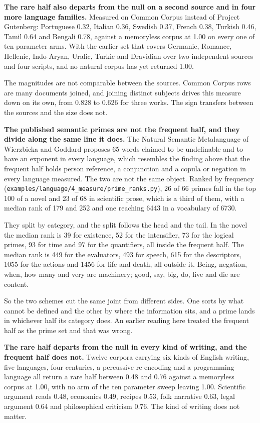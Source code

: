 \textbf{The rare half also departs from the null on a second source and in four more language families.} Measured on Common Corpus instead of Project Gutenberg: Portuguese 0.32, Italian 0.36, Swedish 0.37, French 0.38, Turkish 0.46, Tamil 0.64 and Bengali 0.78, against a memoryless corpus at 1.00 on every one of ten parameter arms. With the earlier set that covers Germanic, Romance, Hellenic, Indo-Aryan, Uralic, Turkic and Dravidian over two independent sources and four scripts, and no natural corpus has yet returned 1.00.

The magnitudes are not comparable between the sources. Common Corpus rows are many documents joined, and joining distinct subjects drives this measure down on its own, from 0.828 to 0.626 for three works. The sign transfers between the sources and the size does not.

\textbf{The published semantic primes are not the frequent half, and they divide along the same line it does.} The Natural Semantic Metalanguage of Wierzbicka and Goddard proposes 65 words claimed to be undefinable and to have an exponent in every language, which resembles the finding above that the frequent half holds person reference, a conjunction and a copula or negation in every language measured. The two are not the same object. Ranked by frequency (\texttt{examples/\allowbreak{}language/\allowbreak{}4\_\allowbreak{}measure/\allowbreak{}prime\_\allowbreak{}ranks.\allowbreak{}py}), 26 of 66 primes fall in the top 100 of a novel and 23 of 68 in scientific prose, which is a third of them, with a median rank of 179 and 252 and one reaching 6443 in a vocabulary of 6730.

They split by category, and the split follows the head and the tail. In the novel the median rank is 39 for existence, 52 for the intensifier, 73 for the logical primes, 93 for time and 97 for the quantifiers, all inside the frequent half. The median rank is 449 for the evaluators, 493 for speech, 615 for the descriptors, 1055 for the actions and 1456 for life and death, all outside it. Being, negation, when, how many and very are machinery; good, say, big, do, live and die are content.

So the two schemes cut the same joint from different sides. One sorts by what cannot be defined and the other by where the information sits, and a prime lands in whichever half its category does. An earlier reading here treated the frequent half as the prime set and that was wrong.

\textbf{The rare half departs from the null in every kind of writing, and the frequent half does not.} Twelve corpora carrying six kinds of English writing, five languages, four centuries, a percussive re-encoding and a programming language all return a rare half between 0.48 and 0.76 against a memoryless corpus at 1.00, with no arm of the ten parameter sweep leaving 1.00. Scientific argument reads 0.48, economics 0.49, recipes 0.53, folk narrative 0.63, legal argument 0.64 and philosophical criticism 0.76. The kind of writing does not matter.

